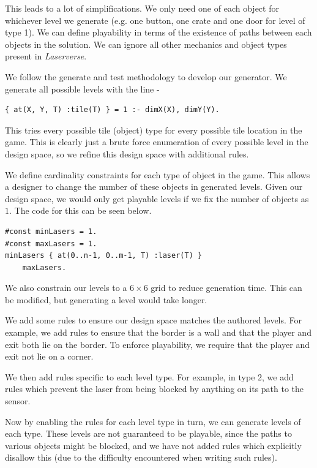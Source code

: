 \documentclass[letterpaper]{article}
\begin{document}
This leads to a lot of simplifications. We only need one of each object for whichever level we generate (e.g. one
button, one crate and one door for level of type 1). We can define playability in terms of the existence of paths
between each objects in the solution. We can ignore all other mechanics and object types present in \textit{Laserverse}.

We follow the generate and test methodology to develop our generator. We generate all possible levels with the line -
\begin{Verbatim}[fontsize=\small]
{ at(X, Y, T) :tile(T) } = 1 :- dimX(X), dimY(Y).
\end{Verbatim}

This tries every possible tile (object) type for every possible tile location in the game. This is clearly just a brute
force enumeration of every possible level in the design space, so we refine this design space with additional rules.

We define cardinality constraints for each type of object in the game. This allows a designer to change the number of
these objects in generated levels. Given our design space, we would only get playable levels if we fix the number of
objects as $1$. The code for this can be seen below.

\begin{Verbatim}[fontsize=\small]
#const minLasers = 1.
#const maxLasers = 1.
minLasers { at(0..n-1, 0..m-1, T) :laser(T) }
    maxLasers.
\end{Verbatim}

We also constrain our levels to a $6 \times 6$ grid to reduce generation time. This can be modified, but generating a
level would take longer.

We add some rules to ensure our design space matches the authored levels. For example, we add rules to ensure that the
border is a wall and that the player and exit both lie on the border. To enforce playability, we require that the player
and exit not lie on a corner.

We then add rules specific to each level type. For example, in type 2, we add rules which prevent the laser from being
blocked by anything on its path to the sensor.

Now by enabling the rules for each level type in turn, we can generate levels of each type. These levels are not
guaranteed to be playable, since the paths to various objects might be blocked, and we have not added rules which
explicitly disallow this (due to the difficulty encountered when writing such rules).
\end{document}
